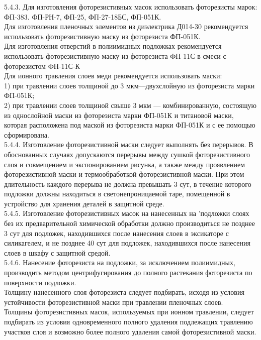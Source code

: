 \documentclass{bmstu}
\begin{document}
	5.4.3. Для изготовления фоторезистивных масок использовать фоторезисты марок: ФП-383. ФП-РН-7, ФП-25, ФП-27-18БС, ФП-051К. \\
	Для изготовления пленочных элементов из диэлектрика Д014-30 рекомендуется использовать фоторезистивную маску из фоторезиста ФП-051К. \\
	Для изготовления отверстий в полиимидных подложках рекомендуется использовать фоторезистивную маску из фоторезиста ФН-11С в смеси с фоторезистом ФН-11С-К \\
	Для ионного травления слоев меди рекомендуется использовать маски: \\
	1) при травлении слоев толщиной до 3 мкм—двухслойную из фоторезиста марки ФП-051К; \\
	2) при травлении слоев толщиной свыше 3 мкм — комбинированную, состоящую из однослойной маски из фоторезиста марки ФП-051К и титановой маски, которая расположена под маской из фоторезиста марки ФП-051К и с ее помощью сформирована. \\
	5.4.4. Изготовление фоторезистивной маски следует выполнять без перерывов. В обоснованных случаях допускаются перерывы между сушкой фоторезистивного слоя и совмещением и экспонированием рисунка, а также между проявлением фоторезистивной маски и термообработкой фоторезистивной маски. При этом длительность каждого перерыва не должна превышать 3 сут, в течение которого подложки должны находиться в светонепроницаемой таре, помещенной в устройство для хранения деталей в защитной среде. \\
	5.4.5. Изготовление фоторезистивных масок на нанесенных на 'подложки слоях без их предварительной химической обработки должно производиться не позднее 3 сут для подложек, находившихся после нанесения слоев в эксикаторе с силикагелем, и не позднее 40 сут для подложек, находившихся после нанесения слоев в  шкафу с защитной средой. \\
	5.4.6. Нанесение фоторезиста на подложки, за исключением полиимидных, производить методом центрифугирования до полного растекания фоторезиста по поверхности подложки. \\
	Толщину нанесенного слоя фоторезиста следует подбирать, исходя из условия устойчивости фоторезистивной маски при травлении пленочных слоев. \\
	Толщины фоторезистивных масок, используемых при ионном травлении, следует подбирать из условия одновременного полного удаления подлежащих травлению участков слоя и возможно более полного удаления самой фоторезистивной маски. \\
\end{document}
